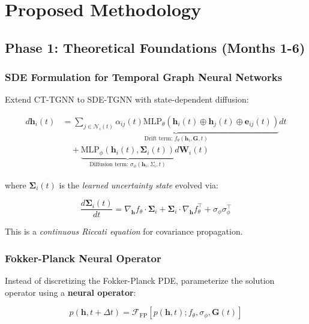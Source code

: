 \documentclass[11pt]{article}
\begin{document}
\section{Proposed Methodology}

\subsection{Phase 1: Theoretical Foundations (Months 1-6)}

\subsubsection{SDE Formulation for Temporal Graph Neural Networks}

Extend CT-TGNN to SDE-TGNN with state-dependent diffusion:

\begin{equation}
\begin{aligned}
d\mathbf{h}_i(t) &= \underbrace{\sum_{j \in \mathcal{N}_i(t)} \alpha_{ij}(t) \text{MLP}_\theta\left(\mathbf{h}_i(t) \oplus \mathbf{h}_j(t) \oplus \mathbf{e}_{ij}(t)\right)}_{\text{Drift term: } f_\theta(\mathbf{h}_i, \mathbf{G}, t)} dt \\
&\quad + \underbrace{\text{MLP}_\phi(\mathbf{h}_i(t), \mathbf{\Sigma}_i(t))}_{\text{Diffusion term: } \sigma_\phi(\mathbf{h}_i, \Sigma_i, t)} d\mathbf{W}_i(t)
\end{aligned}
\end{equation}

where $\mathbf{\Sigma}_i(t)$ is the \textit{learned uncertainty state} evolved via:

\begin{equation}
\frac{d\mathbf{\Sigma}_i(t)}{dt} = \nabla_{\mathbf{h}} f_\theta \cdot \mathbf{\Sigma}_i + \mathbf{\Sigma}_i \cdot \nabla_{\mathbf{h}} f_\theta^\top + \sigma_\phi \sigma_\phi^\top
\end{equation}

This is a \textit{continuous Riccati equation} for covariance propagation.

\subsubsection{Fokker-Planck Neural Operator}

Instead of discretizing the Fokker-Planck PDE, parameterize the solution operator using a \textbf{neural operator}:

\begin{equation}
p(\mathbf{h}, t + \Delta t) = \mathcal{F}_{\text{FP}}[p(\mathbf{h}, t); f_\theta, \sigma_\phi, \mathbf{G}(t)]
\end{equation}
\end{document}
